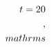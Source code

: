 \documentclass[preview]{standalone}
\begin{document}
\begin{align*}
\special{dvisvgm:raw <g id='unique000'>}t = 20\\,\\mathrm{s}\special{dvisvgm:raw </g>}
\end{align*}
\end{document}
